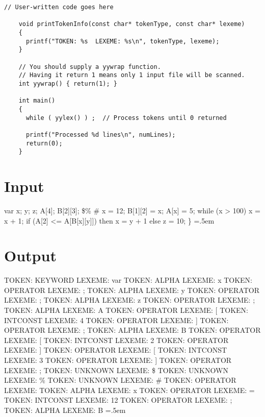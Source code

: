 \documentclass[12pt]{article}
\newenvironment{lcverbatim}
 {\SaveVerbatim{cverb}}
 {\endSaveVerbatim
  \flushleft\fboxrule=0pt\fboxsep=.5em
  \colorbox{cverbbg}{%
    \makebox[\dimexpr\linewidth-2\fboxsep][l]{\BUseVerbatim{cverb}}%
  }
  \endflushleft
}
\begin{document}
\begin{lstlisting}[style=cC++]
    // User-written code goes here

    void printTokenInfo(const char* tokenType, const char* lexeme)
    {
      printf("TOKEN: %s  LEXEME: %s\n", tokenType, lexeme);
    }

    // You should supply a yywrap function.
    // Having it return 1 means only 1 input file will be scanned.
    int yywrap() { return(1); }

    int main()
    {
      while ( yylex() ) ;  // Process tokens until 0 returned

      printf("Processed %d lines\n", numLines);
      return(0);
    }

\end{lstlisting}

\section{Input}
\begin{lcverbatim}
    var
    x; y; z;
    A[4];
    B[2][3];
    \$\% \#
    {
    x = 12;
    B[1][2] = x;
    A[x] = 5;
    while (x > 100) x = x + 1;
    if (A[2] <= A[B[x][y]]) then x = y + 1 else z = 10;
    \}
\end{lcverbatim}

\section{Output}
\begin{lcverbatim}
    TOKEN: KEYWORD  LEXEME: var
    TOKEN: ALPHA  LEXEME: x
    TOKEN: OPERATOR  LEXEME: ;
    TOKEN: ALPHA  LEXEME: y
    TOKEN: OPERATOR  LEXEME: ;
    TOKEN: ALPHA  LEXEME: z
    TOKEN: OPERATOR  LEXEME: ;
    TOKEN: ALPHA  LEXEME: A
    TOKEN: OPERATOR  LEXEME: [
    TOKEN: INTCONST  LEXEME: 4
    TOKEN: OPERATOR  LEXEME: ]
    TOKEN: OPERATOR  LEXEME: ;
    TOKEN: ALPHA  LEXEME: B
    TOKEN: OPERATOR  LEXEME: [
    TOKEN: INTCONST  LEXEME: 2
    TOKEN: OPERATOR  LEXEME: ]
    TOKEN: OPERATOR  LEXEME: [
    TOKEN: INTCONST  LEXEME: 3
    TOKEN: OPERATOR  LEXEME: ]
    TOKEN: OPERATOR  LEXEME: ;
    TOKEN: UNKNOWN  LEXEME: \$
    TOKEN: UNKNOWN  LEXEME: \%
    TOKEN: UNKNOWN  LEXEME: \#
    TOKEN: OPERATOR  LEXEME: {
    TOKEN: ALPHA  LEXEME: x
    TOKEN: OPERATOR  LEXEME: =
    TOKEN: INTCONST  LEXEME: 12
    TOKEN: OPERATOR  LEXEME: ;
    TOKEN: ALPHA  LEXEME: B
\end{lcverbatim}
\end{document}
